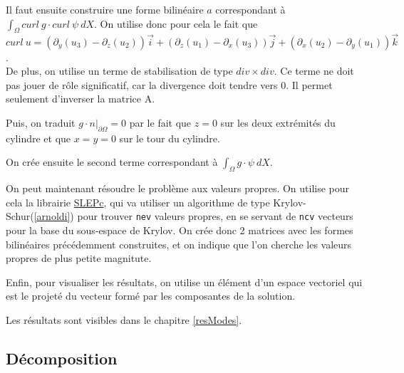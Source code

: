 

Il faut ensuite construire une forme bilinéaire $a$ correspondant à $\int_\Omega curl\ g\cdot curl\ \psi\ dX$. On utilise donc pour cela le fait que $curl\ u = (\partial_y(u_3)-\partial_z(u_2))\vec{i} + (\partial_z(u_1) - \partial_x(u_3))\vec{j} + (\partial_x(u_2)-\partial_y(u_1))\vec{k}$.\\
De plus, on utilise un terme de stabilisation de type $div \times div$. Ce terme ne doit pas jouer de rôle significatif, car la divergence doit tendre vers 0. Il permet seulement d'inverser la matrice A.



Puis, on traduit $g\cdot n\big\rvert_{\partial\Omega}=0$ par le fait que $z=0$ sur les deux extrémités du cylindre et que $x=y=0$ sur le tour du cylindre.



On crée ensuite le second terme correspondant à $\int_\Omega g\cdot\psi\ dX$.



On peut maintenant résoudre le problème aux valeurs propres. On utilise pour cela la librairie \href{http://www.grycap.upv.es/slepc/}{SLEPc}, qui va utiliser un algorithme de type Krylov-Schur(\ref{arnoldi}) pour trouver \texttt{nev} valeurs propres, en se servant de \texttt{ncv} vecteurs pour la base du sous-espace de Krylov. On crée donc 2 matrices avec les formes bilinéaires précédemment construites, et on indique que l'on cherche les valeurs propres de plus petite magnitute.



Enfin, pour visualiser les résultats, on utilise un élément d'un espace vectoriel qui est le projeté du vecteur formé par les composantes de la solution.



Les résultats sont visibles dans le chapitre \ref{resModes}.

\subsection{Décomposition}

\fi

